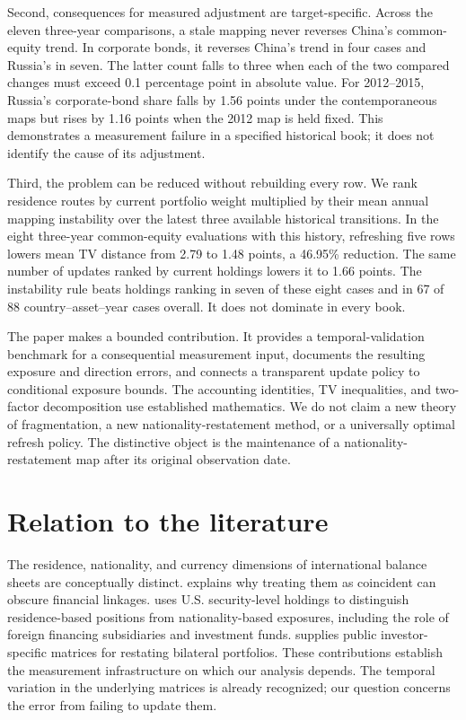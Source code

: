 \documentclass[11pt,a4paper]{article}
\begin{document}
Second, consequences for measured adjustment are target-specific. Across the eleven three-year comparisons, a stale mapping never reverses China's common-equity trend. In corporate bonds, it reverses China's trend in four cases and Russia's in seven. The latter count falls to three when each of the two compared changes must exceed 0.1 percentage point in absolute value. For 2012--2015, Russia's corporate-bond share falls by 1.56 points under the contemporaneous maps but rises by 1.16 points when the 2012 map is held fixed. This demonstrates a measurement failure in a specified historical book; it does not identify the cause of its adjustment.

Third, the problem can be reduced without rebuilding every row. We rank residence routes by current portfolio weight multiplied by their mean annual mapping instability over the latest three available historical transitions. In the eight three-year common-equity evaluations with this history, refreshing five rows lowers mean TV distance from 2.79 to 1.48 points, a 46.95\% reduction. The same number of updates ranked by current holdings lowers it to 1.66 points. The instability rule beats holdings ranking in seven of these eight cases and in 67 of 88 country--asset--year cases overall. It does not dominate in every book.

The paper makes a bounded contribution. It provides a temporal-validation benchmark for a consequential measurement input, documents the resulting exposure and direction errors, and connects a transparent update policy to conditional exposure bounds. The accounting identities, TV inequalities, and two-factor decomposition use established mathematics. We do not claim a new theory of fragmentation, a new nationality-restatement method, or a universally optimal refresh policy. The distinctive object is the maintenance of a nationality-restatement map after its original observation date.

\section{Relation to the literature}
The residence, nationality, and currency dimensions of international balance sheets are conceptually distinct. \citet{triple} explains why treating them as coincident can obscure financial linkages. \citet{bbc} uses U.S. security-level holdings to distinguish residence-based positions from nationality-based exposures, including the role of foreign financing subsidiaries and investment funds. \citet{cmns} supplies public investor-specific matrices for restating bilateral portfolios. These contributions establish the measurement infrastructure on which our analysis depends. The temporal variation in the underlying matrices is already recognized; our question concerns the error from failing to update them.
\end{document}
